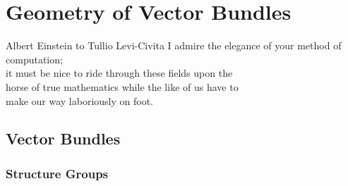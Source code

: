 \chapter{Geometry of Vector Bundles}\label{chap:vector-bundles}

\begin{epigraph}{24em}{Albert Einstein {\normalfont to} Tullio Levi-Civita}
	I admire the elegance of your method of computation;\\
	it must be nice to ride through these fields upon the\\
  horse of true mathematics while the like of us have to\\
  make our way laboriously on foot.\\
\end{epigraph}

\section{Vector Bundles}

\subsection{Structure Groups}\label{sec:structure-groups}

